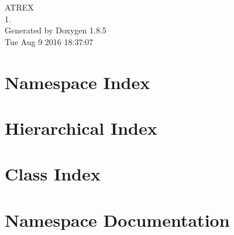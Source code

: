 \documentclass[twoside]{book}
\newcommand{\clearemptydoublepage}{%
  \newpage{\pagestyle{empty}\cleardoublepage}%
}
\begin{document}
\hypersetup{pageanchor=false}
\begin{titlepage}
\vspace*{7cm}
\begin{center}%
{\Large A\-T\-R\-E\-X \\[1ex]\large 1. }\\
\vspace*{1cm}
{\large Generated by Doxygen 1.8.5}\\
\vspace*{0.5cm}
{\small Tue Aug 9 2016 18:37:07}\\
\end{center}
\end{titlepage}
\clearemptydoublepage
\tableofcontents
\clearemptydoublepage
{}
\hypersetup{pageanchor=true}

\chapter{Namespace Index}

\chapter{Hierarchical Index}

\chapter{Class Index}

\chapter{Namespace Documentation}


\end{document}
